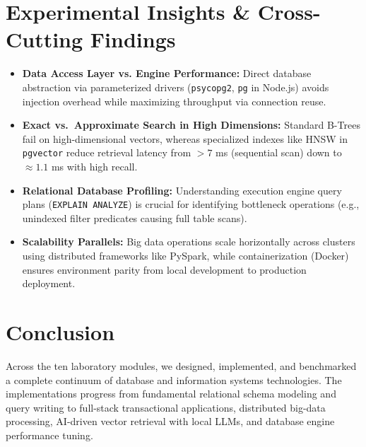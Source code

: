 \documentclass[10pt,a4paper]{article}
\begin{document}
\section{Experimental Insights \& Cross-Cutting Findings}
\begin{itemize}
    \item \textbf{Data Access Layer vs. Engine Performance:} Direct database abstraction via parameterized drivers (\texttt{psycopg2}, \texttt{pg} in Node.js) avoids injection overhead while maximizing throughput via connection reuse.
    \item \textbf{Exact vs.\ Approximate Search in High Dimensions:} Standard B-Trees fail on high-dimensional vectors, whereas specialized indexes like HNSW in \texttt{pgvector} reduce retrieval latency from $>7$ ms (sequential scan) down to $\approx 1.1$ ms with high recall.
    \item \textbf{Relational Database Profiling:} Understanding execution engine query plans (\texttt{EXPLAIN ANALYZE}) is crucial for identifying bottleneck operations (e.g., unindexed filter predicates causing full table scans).
    \item \textbf{Scalability Parallels:} Big data operations scale horizontally across clusters using distributed frameworks like PySpark, while containerization (Docker) ensures environment parity from local development to production deployment.
\end{itemize}

\section{Conclusion}
Across the ten laboratory modules, we designed, implemented, and benchmarked a complete continuum of database and information systems technologies. The implementations progress from fundamental relational schema modeling and query writing to full-stack transactional applications, distributed big-data processing, AI-driven vector retrieval with local LLMs, and database engine performance tuning.
\end{document}
